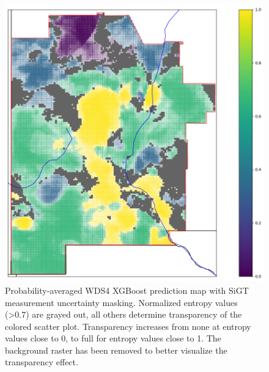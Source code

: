 \begin{figure}%
\centering
\includegraphics[width=.75\textwidth]{templates/images/Figure-MU_Masked_Average_Gradient_Map.png}
\caption[SiGT measurement uncertainty mask on prediction map]
{Probability-averaged WDS4 XGBoost prediction map with SiGT measurement uncertainty masking. Normalized entropy values (>0.7) are grayed out, all others determine transparency of the colored scatter plot. Transparency increases from none at entropy values close to 0, to full for entropy values close to 1. The background raster has been removed to better visualize the transparency effect.}
\label{fig:mu_masked_pred_map}
\end{figure}

